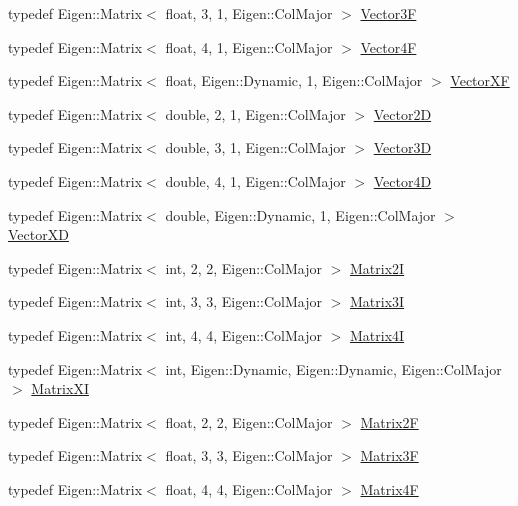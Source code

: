 \begin{DoxyCompactItemize}
typedef Eigen\+::\+Matrix$<$ float, 3, 1, Eigen\+::\+Col\+Major $>$ \hyperlink{namespaceg2o_a0c03efd6b49abac71bfb012cc3237288}{Vector3F}
\item 
typedef Eigen\+::\+Matrix$<$ float, 4, 1, Eigen\+::\+Col\+Major $>$ \hyperlink{namespaceg2o_aebecb51a41734608aeea377a31ee88c6}{Vector4F}
\item 
typedef Eigen\+::\+Matrix$<$ float, Eigen\+::\+Dynamic, 1, Eigen\+::\+Col\+Major $>$ \hyperlink{namespaceg2o_a79143ea34679a74ee7ab02342b3a21df}{Vector\+XF}
\item 
typedef Eigen\+::\+Matrix$<$ double, 2, 1, Eigen\+::\+Col\+Major $>$ \hyperlink{namespaceg2o_a98731c1a538fbbbb105bc81434ebdecb}{Vector2D}
\item 
typedef Eigen\+::\+Matrix$<$ double, 3, 1, Eigen\+::\+Col\+Major $>$ \hyperlink{namespaceg2o_a944c2b1b0f84d33a7b297a4a585bf319}{Vector3D}
\item 
typedef Eigen\+::\+Matrix$<$ double, 4, 1, Eigen\+::\+Col\+Major $>$ \hyperlink{namespaceg2o_afd9c8c912186d1f96141027c854fce42}{Vector4D}
\item 
typedef Eigen\+::\+Matrix$<$ double, Eigen\+::\+Dynamic, 1, Eigen\+::\+Col\+Major $>$ \hyperlink{namespaceg2o_ab67b68e8bc395b2085174937de1a634d}{Vector\+XD}
\item 
typedef Eigen\+::\+Matrix$<$ int, 2, 2, Eigen\+::\+Col\+Major $>$ \hyperlink{namespaceg2o_ac9319963099ff600cf7c6251d7e937e1}{Matrix2I}
\item 
typedef Eigen\+::\+Matrix$<$ int, 3, 3, Eigen\+::\+Col\+Major $>$ \hyperlink{namespaceg2o_ab8a98dad54fdc966987b61b750e03201}{Matrix3I}
\item 
typedef Eigen\+::\+Matrix$<$ int, 4, 4, Eigen\+::\+Col\+Major $>$ \hyperlink{namespaceg2o_a10216d68ff0555e64c628cf7f5f3bb7a}{Matrix4I}
\item 
typedef Eigen\+::\+Matrix$<$ int, Eigen\+::\+Dynamic, Eigen\+::\+Dynamic, Eigen\+::\+Col\+Major $>$ \hyperlink{namespaceg2o_a43b1af9ed52619c66479d4820a126aef}{Matrix\+XI}
\item 
typedef Eigen\+::\+Matrix$<$ float, 2, 2, Eigen\+::\+Col\+Major $>$ \hyperlink{namespaceg2o_a07b62708470b4ff9ade2f9609e30310c}{Matrix2F}
\item 
typedef Eigen\+::\+Matrix$<$ float, 3, 3, Eigen\+::\+Col\+Major $>$ \hyperlink{namespaceg2o_aff36b18c387a854e64af640ad5cb0bd7}{Matrix3F}
\item 
typedef Eigen\+::\+Matrix$<$ float, 4, 4, Eigen\+::\+Col\+Major $>$ \hyperlink{namespaceg2o_afe979d0d6b88b375b29c06eb49df71fb}{Matrix4F}
\item 

\end{DoxyCompactItemize}
